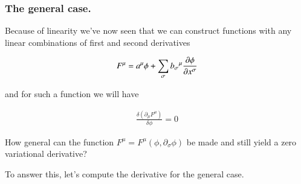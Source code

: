 \documentclass{article}
\begin{document}
\subsubsection{ The general case. }

Because of linearity we've now seen that we can construct functions with
any linear combinations of first and second derivatives

\begin{align*}
F^\mu = a^\mu \phi + \sum_\sigma {b_\sigma}^\mu \frac{\partial {\phi}}{\partial {x^\sigma}}
\end{align*}

and for such a function we will have

\begin{align*}
\frac{\delta (\partial_\mu F^\mu)}{\delta \phi}  = 0
\end{align*}

How general can the function $F^\mu = F^\mu(\phi, \partial_\sigma \phi)$ be 
made and still yield a zero variational derivative?

To answer this, let's compute the derivative for the general case.





\end{document}
